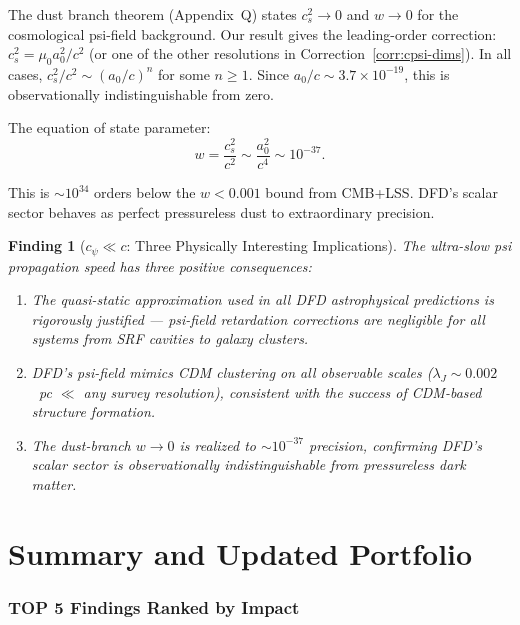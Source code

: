 \documentclass[11pt]{article}
\newtheorem{finding}{Finding}
\newcommand{\ee}[1]{\times 10^{#1}}
\begin{document}
The dust branch theorem (Appendix~Q) states $c_s^2 \to 0$ and $w \to 0$
for the cosmological psi-field background. Our result gives the
leading-order correction: $c_s^2 = \mu_0 a_0^2/c^2$ (or one of the
other resolutions in Correction~\ref{corr:cpsi-dims}). In all cases,
$c_s^2/c^2 \sim (a_0/c)^n$ for some $n \geq 1$. Since $a_0/c \sim
3.7\ee{-19}$, this is observationally indistinguishable from zero.

The equation of state parameter:
\begin{equation}
w = \frac{c_s^2}{c^2} \sim \frac{a_0^2}{c^4} \sim 10^{-37}.
\end{equation}

This is $\sim 10^{34}$ orders below the $w < 0.001$ bound from CMB+LSS.
DFD's scalar sector behaves as perfect pressureless dust to extraordinary
precision.

\begin{finding}[$c_\psi \ll c$: Three Physically Interesting Implications]
\label{find:implications}
The ultra-slow psi propagation speed has three positive consequences:
\begin{enumerate}[nosep]
\item The quasi-static approximation used in all DFD astrophysical predictions
  is rigorously justified --- psi-field retardation corrections are
  negligible for all systems from SRF cavities to galaxy clusters.
\item DFD's psi-field mimics CDM clustering on all observable scales
  ($\lambda_J \sim 0.002$~pc $\ll$ any survey resolution), consistent
  with the success of CDM-based structure formation.
\item The dust-branch $w \to 0$ is realized to $\sim 10^{-37}$ precision,
  confirming DFD's scalar sector is observationally indistinguishable
  from pressureless dark matter.
\end{enumerate}
\end{finding}


\part{Summary and Updated Portfolio}
\label{part:summary}

\section{TOP 5 Findings Ranked by Impact}
\end{document}
